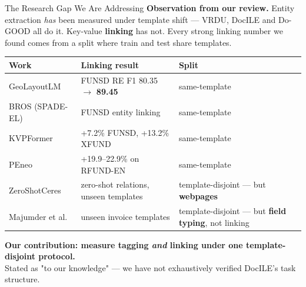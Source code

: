 \documentclass[aspectratio=169, 11pt]{beamer}
\renewcommand{\arraystretch}{1.15}
\begin{document}
\begin{frame}{The Research Gap We Are Addressing}
  \footnotesize
  {\color{warn}\textbf{Observation from our review.}} Entity extraction \emph{has} been measured
  under template shift — VRDU, DocILE and Do-GOOD all do it. Key-value \textbf{linking} has not.
  Every strong linking number we found comes from a split where train and test share templates.

  \vspace{1pt}
  \scriptsize
  {\renewcommand{\arraystretch}{0.95}
  \begin{tabular}{@{}>{\raggedright\arraybackslash}p{2.4cm}>{\raggedright\arraybackslash}p{5.3cm}>{\raggedright\arraybackslash}p{4.6cm}@{}}
    \toprule
    \textbf{Work} & \textbf{Linking result} & \textbf{Split}\\
    \midrule
    GeoLayoutLM & FUNSD RE F1 80.35 $\to$ \textbf{89.45} & same-template \\
    BROS (SPADE-EL) & FUNSD entity linking & same-template \\
    KVPFormer & +7.2\% FUNSD, +13.2\% XFUND & same-template \\
    PEneo & +19.9--22.9\% on RFUND-EN & same-template \\
    ZeroShotCeres & zero-shot relations, unseen templates & \textcolor{good}{template-disjoint} — but \textbf{webpages}\\
    Majumder et al. & unseen invoice templates & \textcolor{good}{template-disjoint} — but \textbf{field typing}, not linking\\
    \bottomrule
  \end{tabular}}

  \vspace{1pt}
  \footnotesize\centering\textbf{Our contribution: measure tagging \emph{and} linking under one template-disjoint protocol.}\\
  {\scriptsize\color{muted} Stated as "to our knowledge" — we have not exhaustively verified DocILE's task structure.}
\end{frame}
\end{document}
